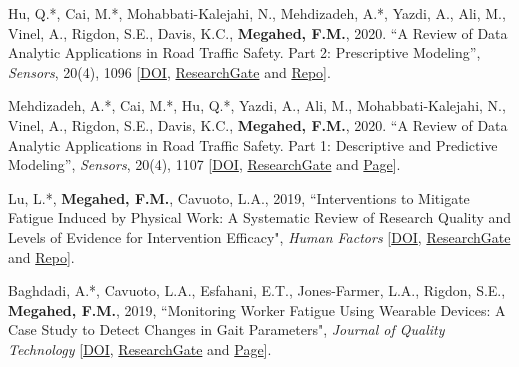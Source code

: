 \documentclass[margin,line]{res}
\begin{document}
\begin{resume}
\vspace{-1.5mm}

Hu, Q.*, Cai, M.*, Mohabbati-Kalejahi, N., Mehdizadeh, A.*, Yazdi, A., Ali, M., Vinel, A., Rigdon, S.E., Davis, K.C., \textbf{Megahed, F.M.}, 2020. ``A Review of Data Analytic Applications in Road Traffic Safety. Part 2: Prescriptive Modeling'', \textit{Sensors}, 20(4), 1096 [\faFile*\href{https://doi.org/10.3390/s20041096}{DOI}, \faResearchgate \href{https://www.researchgate.net/publication/339378400_A_Review_of_Data_Analytic_Applications_in_Road_Traffic_Safety_Part_2_Prescriptive_Modeling}{ResearchGate} and \faGithub \href{https://github.com/caimiao0714/optimization_stats_case_study}{Repo}].


\vspace{-1.5mm}

Mehdizadeh, A.*, Cai, M.*, Hu, Q.*, Yazdi, A., Ali, M., Mohabbati-Kalejahi, N., Vinel, A., Rigdon, S.E., Davis, K.C., \textbf{Megahed, F.M.}, 2020. ``A Review of Data Analytic Applications in Road Traffic Safety. Part 1: Descriptive and Predictive Modeling'', \textit{Sensors}, 20(4), 1107 [\faFile*\href{https://doi.org/10.3390/s20041107}{DOI}, \faResearchgate \href{https://www.researchgate.net/publication/339379853_A_Review_of_Data_Analytic_Applications_in_Road_Traffic_Safety_Part_1_Descriptive_and_Predictive_Modeling}{ResearchGate} and \faGithub \href{https://caimiao0714.github.io/TrafficSafetyReviewRmarkdown/}{Page}].

\vspace{-1.5mm}

Lu, L.*, \textbf{Megahed, F.M.}, Cavuoto, L.A., 2019, ``Interventions to Mitigate Fatigue Induced by Physical Work: A Systematic Review of Research Quality and Levels of Evidence for Intervention Efficacy", \textit{Human Factors} [\faFile*\href{https://doi.org/10.1177/0018720819876141}{DOI}, \faResearchgate \href{https://www.researchgate.net/publication/336405916_Interventions_to_Mitigate_Fatigue_Induced_by_Physical_Work_A_Systematic_Review_of_Research_Quality_and_Levels_of_Evidence_for_Intervention_Efficacy}{ResearchGate} and \faGithub \href{https://github.com/fmegahed/fatigue-interventions}{Repo}].

\vspace{-1.5mm}
Baghdadi, A.*, Cavuoto, L.A., Esfahani, E.T., Jones-Farmer, L.A., Rigdon, S.E., \textbf{Megahed, F.M.}, 2019, ``Monitoring Worker Fatigue Using Wearable Devices: A Case Study to Detect Changes in Gait Parameters", \textit{Journal of Quality Technology} [\faFile*\href{https://doi.org/10.1080/00224065.2019.1640097}{DOI}, \faResearchgate \href{https://www.researchgate.net/publication/333891627_Monitoring_Worker_Fatigue_Using_Wearable_Devices_A_Case_Study_to_Detect_Changes_in_Gait_Parameters}{ResearchGate} and \faGithub \href{https://fmegahed.github.io/fatigue_case_jqt.html}{Page}].


\end{resume}
\end{document}
